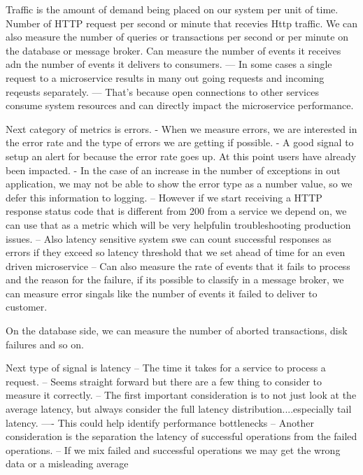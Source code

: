 \documentclass[a4paper, 11pt]{book}
\begin{document}
    Traffic is the amount of demand being placed on our system per unit of time.
    Number of HTTP request per second or minute that recevies Http traffic.
    We can also measure the number of queries or transactions per second or per minute on the database or message broker.
    Can measure the number of events it receives adn the number of events it delivers to consumers.
    --- In some cases a single request to a microservice results in many out going requests and incoming reqeusts separately.
    --- That's because open connections to other services consume system resources and can directly impact the microservice performance.

    Next category of metrics is errors.
    - When we measure errors, we are interested in the error rate and the type of errors we are getting if possible.
    - A good signal to setup an alert for because the error rate goes up.
    At this point users have already been impacted.
    - In the case of an increase in the number of exceptions in out application, we may not be able to show the error type as a number value, so we defer this information to logging.
    -- However if we start receiving a HTTP response status code that is different from 200 from a service we depend on, we can use that as a metric which will be very helpfulin troubleshooting production issues.
    -- Also latency sensitive system swe can count successful responses as errors if they exceed so latency threshold that we set ahead of time for an even driven microservice
    -- Can also measure the rate of events that it fails to process and the reason for the failure, if its possible to classify in a message broker, we can measure error singals like the number of events it failed to deliver to customer.

    On the database side, we can measure the number of aborted transactions, disk failures and so on.

    Next type of signal is latency
    -- The time it takes for a service to process a request.
    -- Seems straight forward but there are a few thing to consider to measure it correctly.
    -- The first important consideration is to not just look at the average latency, but always consider the full latency distribution....especially tail latency.
    ---- This could help identify performance bottlenecks
    -- Another consideration is the separation the latency of successful operations from the failed operations.
    -- If we mix failed and successful operations we may get the wrong data or a misleading average
\end{document}
